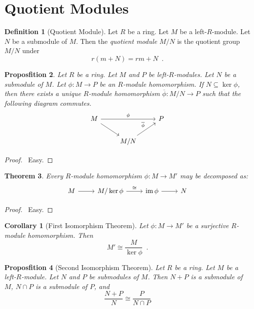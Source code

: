 \documentclass{book}
\let\qed\relax
\newtheorem{prop}{Proposfition}[chapter]
\newtheorem{thm}[prop]{Theorem}
\newtheorem{cor}{Corollary}[prop]
\theoremstyle{definition}
\newtheorem{df}[prop]{Definition}
\newcommand{\im}{\ensuremath{\operatorname{im}}}
\begin{document}
\section{Quotient Modules}

\begin{df}[Quotient Module]
Let $R$ be a ring. Let $M$ be a left-$R$-module. Let $N$ be a submodule of $M$. Then the \emph{quotient module} $M/N$ is the quotient group $M/N$ under
\[ r(m+N) = rm+N \enspace . \]
\end{df}

\begin{prop}
Let $R$ be a ring. Let $M$ and $P$ be left-$R$-modules. Let $N$ be a submodule of $M$. Let $\phi : M \rightarrow P$ be an $R$-module homomorphism. If $N \subseteq \ker \phi$, then there exists a unique $R$-module homomorphism $\overline{\phi} : M / N \rightarrow P$ such that the following diagram commutes.
\[ \begin{tikzcd}
M \arrow[rr,"\phi"] \arrow[dr] & & P \\
& M/N \arrow[ur,"\overline{\phi}"]
\end{tikzcd} \]
\end{prop}

\begin{proof}
\pf\ Easy. \qed
\end{proof}

\begin{thm}
Every $R$-module homomorphism $\phi : M \rightarrow M'$ may be decomposed as:
\[ \begin{tikzcd}
M \arrow[r] & M / \ker \phi \arrow[r,"\cong"] & \im \phi \arrow[r] & N 
\end{tikzcd} \]
\end{thm}

\begin{proof}
\pf\ Easy. \qed
\end{proof}

\begin{cor}[First Isomorphism Theorem]
Let $\phi : M \rightarrow M'$ be a surjective $R$-module homomorphism. Then
\[ M' \cong \frac{M}{\ker \phi} \enspace . \]
\end{cor}

\begin{prop}[Second Isomorphism Theorem]
Let $R$ be a ring. Let $M$ be a left-$R$-module. Let $N$ and $P$ be submodules of $M$. Then $N+P$ is a submodule of $M$, $N \cap P$ is a submodule of $P$, and
\[ \frac{N+P}{N} \cong \frac{P}{N \cap P} \]
\end{prop}
\end{document}
